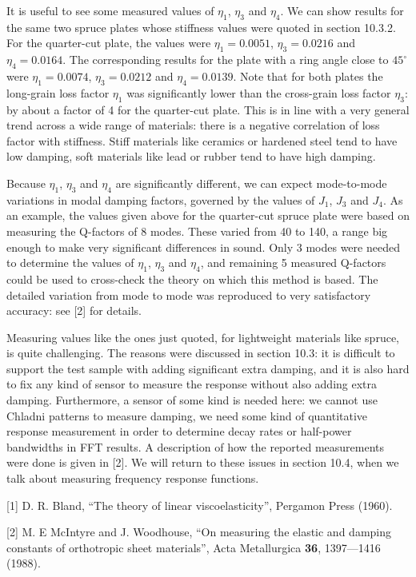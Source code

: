   It is useful to see some measured values of $\eta_1$, $\eta_3$ and $\eta_4$. 
  We can show results for the same two spruce plates whose stiffness values 
  were quoted in section 10.3.2. For the quarter-cut plate, the values were 
  $\eta_1 = 0.0051$, $\eta_3 = 0.0216$ and $\eta_4 = 0.0164$. The corresponding 
  results for the plate with a ring angle close to $45^\circ$ were $\eta_1 = 
  0.0074$, $\eta_3 = 0.0212$ and $\eta_4 = 0.0139$. Note that for both plates 
  the long-grain loss factor $\eta_1$ was significantly lower than the 
  cross-grain loss factor $\eta_3$: by about a factor of 4 for the quarter-cut 
  plate. This is in line with a very general trend across a wide range of 
  materials: there is a negative correlation of loss factor with stiffness. 
  Stiff materials like ceramics or hardened steel tend to have low damping, 
  soft materials like lead or rubber tend to have high damping. 

  Because $\eta_1$, $\eta_3$ and $\eta_4$ are significantly different, we can 
  expect mode-to-mode variations in modal damping factors, governed by the 
  values of $J_1$, $J_3$ and $J_4$. As an example, the values given above for 
  the quarter-cut spruce plate were based on measuring the Q-factors of 8 
  modes. These varied from 40 to 140, a range big enough to make very 
  significant differences in sound. Only 3 modes were needed to determine the 
  values of $\eta_1$, $\eta_3$ and $\eta_4$, and remaining 5 measured Q-factors 
  could be used to cross-check the theory on which this method is based. The 
  detailed variation from mode to mode was reproduced to very satisfactory 
  accuracy: see [2] for details. 

  Measuring values like the ones just quoted, for lightweight materials like 
  spruce, is quite challenging. The reasons were discussed in section 10.3: it 
  is difficult to support the test sample with adding significant extra 
  damping, and it is also hard to fix any kind of sensor to measure the 
  response without also adding extra damping. Furthermore, a sensor of some 
  kind is needed here: we cannot use Chladni patterns to measure damping, we 
  need some kind of quantitative response measurement in order to determine 
  decay rates or half-power bandwidths in FFT results. A description of how the 
  reported measurements were done is given in [2]. We will return to these 
  issues in section 10.4, when we talk about measuring frequency response 
  functions. 

  \sectionreferences{}[1] D. R. Bland, “The theory of linear viscoelasticity”, 
  Pergamon Press (1960). 

  [2] M. E McIntyre and J. Woodhouse, “On measuring the elastic and damping 
  constants of orthotropic sheet materials”, Acta Metallurgica \textbf{36}, 
  1397—1416 (1988). 
